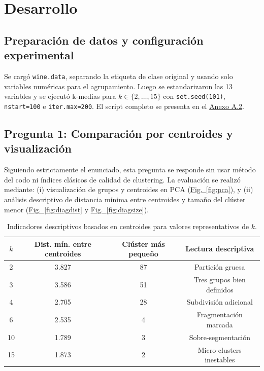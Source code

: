 \documentclass[10pt,a4paper]{article}
\begin{document}
\section{Desarrollo}

\subsection{Preparación de datos y configuración experimental}

Se cargó \texttt{wine.data}, separando la etiqueta de clase original y usando solo variables numéricas para el agrupamiento. Luego se estandarizaron las 13 variables y se ejecutó k-medias para $k \in \{2,\dots,15\}$ con \texttt{set.seed(101)}, \texttt{nstart=100} e \texttt{iter.max=200}. El script completo se presenta en el \hyperref[anx:script]{Anexo A.2}.

\subsection{Pregunta 1: Comparación por centroides y visualización}

Siguiendo estrictamente el enunciado, esta pregunta se responde sin usar método del codo ni índices clásicos de calidad de clustering. La evaluación se realizó mediante: (i) visualización de grupos y centroides en PCA (\hyperref[fig:pca]{Fig.~\ref*{fig:pca}}), y (ii) análisis descriptivo de distancia mínima entre centroides y tamaño del clúster menor (\hyperref[fig:diagdist]{Fig.~\ref*{fig:diagdist}} y \hyperref[fig:diagsize]{Fig.~\ref*{fig:diagsize}}).

\begin{table}[H]
\centering
\footnotesize
\begin{tabular}{c c c c}
\toprule
$k$ & Dist. mín. entre centroides & Clúster más pequeño & Lectura descriptiva \\
\midrule
2 & 3.827 & 87 & Partición gruesa \\
3 & 3.586 & 51 & Tres grupos bien definidos \\
4 & 2.705 & 28 & Subdivisión adicional \\
6 & 2.535 & 4 & Fragmentación marcada \\
10 & 1.789 & 3 & Sobre-segmentación \\
15 & 1.873 & 2 & Micro-clusters inestables \\
\bottomrule
\end{tabular}
\caption{Indicadores descriptivos basados en centroides para valores representativos de $k$.}
\label{tab:p1centroides}
\end{table}
\end{document}
